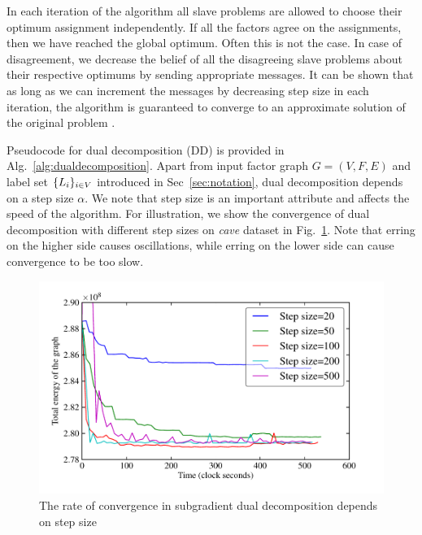 \documentclass[letterpaper, 10 pt, conference]{ieeeconf} %
\begin{document}
In each iteration of the algorithm all slave problems are allowed to choose
their optimum assignment independently. If all the factors agree on the
assignments, then we have reached the global optimum. Often this is
not the case. In case of disagreement, we decrease the belief of all the
disagreeing slave problems about their respective optimums by sending
appropriate messages. It can be shown that as long as we can increment the
messages by decreasing step size in each iteration, the algorithm is
guaranteed to converge to an approximate solution of the original problem
\cite{sontag2011introduction}.

Pseudocode for dual decomposition (DD) is provided in
Alg.~\ref{alg:dualdecomposition}. Apart from input factor graph $G = (V, F, E)$
and label set $\{L_i\}_{i \in V}$ introduced in Sec~\ref{sec:notation}, dual
decomposition depends on a step size $\alpha$.
We note that step size is an important attribute and affects the speed of the algorithm. 
For illustration, we show the convergence of dual decomposition with different
step sizes on \emph{cave} dataset in Fig.~\ref{fig:dualdecomposition-stepsize}. 
Note that erring on the higher side causes oscillations, while erring on the
lower side can cause convergence to be too slow.

\begin{figure}
  \includegraphics[width=\columnwidth]{../../Data/plot-time-energy-step.pdf}%
    \caption{The rate of convergence in subgradient dual decomposition depends on step size}
    \label{fig:dualdecomposition-stepsize}%
\end{figure}
\end{document}
